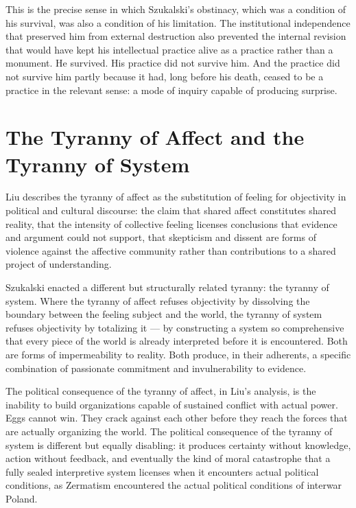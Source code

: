 \documentclass[11pt, a4paper]{article}
\theoremstyle{named}
\begin{document}
This is the precise sense in which Szukalski's obstinacy, which was
a condition of his survival, was also a condition of his limitation.
The institutional independence that preserved him from external
destruction also prevented the internal revision that would have kept
his intellectual practice alive as a practice rather than a monument.
He survived. His practice did not survive him. And the practice did
not survive him partly because it had, long before his death, ceased
to be a practice in the relevant sense: a mode of inquiry capable of
producing surprise.

\section{The Tyranny of Affect and the Tyranny of System}

Liu describes the tyranny of affect as the substitution of feeling
for objectivity in political and cultural discourse: the claim that
shared affect constitutes shared reality, that the intensity of
collective feeling licenses conclusions that evidence and argument
could not support, that skepticism and dissent are forms of violence
against the affective community rather than contributions to a shared
project of understanding.

Szukalski enacted a different but structurally related tyranny: the
tyranny of system. Where the tyranny of affect refuses objectivity
by dissolving the boundary between the feeling subject and the world,
the tyranny of system refuses objectivity by totalizing it — by
constructing a system so comprehensive that every piece of the world
is already interpreted before it is encountered. Both are forms of
impermeability to reality. Both produce, in their adherents, a
specific combination of passionate commitment and invulnerability to
evidence.

The political consequence of the tyranny of affect, in Liu's analysis,
is the inability to build organizations capable of sustained conflict
with actual power. Eggs cannot win. They crack against each other
before they reach the forces that are actually organizing the world.
The political consequence of the tyranny of system is different but
equally disabling: it produces certainty without knowledge, action
without feedback, and eventually the kind of moral catastrophe that
a fully sealed interpretive system licenses when it encounters actual
political conditions, as Zermatism encountered the actual political
conditions of interwar Poland.
\end{document}
